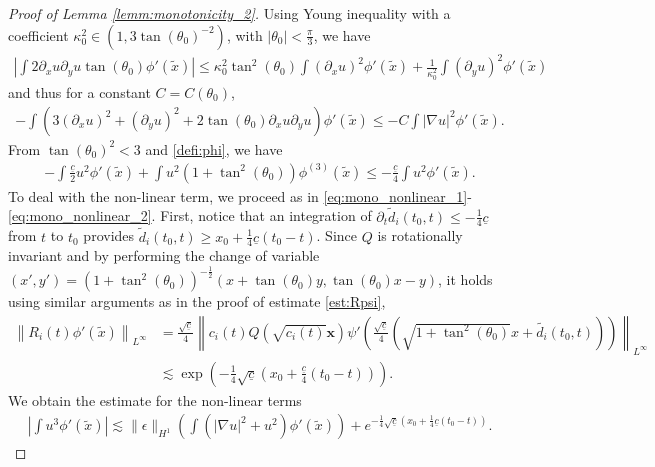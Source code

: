\documentclass[reqno,10pt]{amsart}
\numberwithin{equation}{section}
\newcommand{\bx}{\mathbf{x}}
\begin{document}
\begin{proof}[Proof of Lemma \ref{lemm:monotonicity_2}]
	Using Young inequality with a coefficient $\kappa_0^2 \in (1, 3 \tan(\theta_0)^{-2})$, with $\vert \theta_0 \vert < \frac{\pi}{3}$, we have
	\begin{align*}
		\left\vert \int 2 \partial_x u \partial_y u \tan(\theta_0) \phi'(\tilde{x}) \right\vert \leq \kappa_0^2 \tan^2(\theta_0) \int (\partial_x u)^2 \phi'(\tilde{x})  + \frac{1}{\kappa_0^2} \int (\partial_y u)^2 \phi'(\tilde{x}) 
	\end{align*}
	and thus for a constant $C= C(\theta_0)$, 
	\begin{align*}
		-\int \left( 3 (\partial_x u )^2 + (\partial_y u)^2 + 2 \tan(\theta_0) \partial_x u \partial_y u \right) \phi'(\tilde{x}) \leq - C \int \vert \nabla u \vert ^2 \phi'(\tilde{x}).
	\end{align*}
	From $\tan(\theta_0)^2 < 3$ and \eqref{defi:phi}, we have
	\begin{align*}
		-\int \frac{\underline{c}}{2} u^2 \phi'(\tilde{x}) + \int u^2 (1+\tan^2(\theta_0)) \phi^{(3)}(\tilde{x}) \leq - \frac{\underline{c}}{4} \int u^2 \phi'(\tilde{x}).
	\end{align*}
	To deal with the non-linear term, we proceed as in \eqref{eq:mono_nonlinear_1}-\eqref{eq:mono_nonlinear_2}. First, notice that an integration of $\partial_t \tilde{d}_i(t_0,t) \leq - \frac14 \underline{c}$ from $t$ to $t_0$ provides  $\tilde{d}_i(t_0,t) \geq x_0 + \frac14 \underline{c} (t_0-t)$. Since $Q$ is rotationally invariant and by performing the change of variable $(x',y')= (1+\tan^2(\theta_0))^{-\frac12} \left( x+ \tan(\theta_0)y, \tan(\theta_0)x -y \right)$, it holds using similar arguments as in the proof of estimate \eqref{est:Rpsi},
	\begin{align}
		\left\| R_i(t) \phi'(\tilde{x}) \right\|_{L^\infty} 
		& = \frac{\sqrt{\underline{c}}}{4} \left\| c_i(t) Q(\sqrt{c_i(t)}\bx) \psi' \left(\frac{\sqrt{\underline{c}}}{4} \left( \sqrt{1+\tan^2(\theta_0)} x + \tilde{d_i}(t_0,t) \right) \right) \right\|_{L^\infty} \nonumber \\
		& \lesssim \exp \left( - \frac14 \sqrt{\underline{c}} \left(x_0 + \frac{\underline{c}}{4} (t_0-t)\right) \right).\label{sol_wave_weight}
	\end{align}
 We obtain the estimate for the non-linear terms
	\begin{align}\label{eq:cubic_term_2}
		\left\vert  \int u^3 \phi'(\tilde{x}) \right\vert \lesssim \| \epsilon \|_{H^1} \left( \int \left( \vert \nabla u \vert^2 + u^2 \right) \phi'(\tilde{x}) \right) + e^{-\frac14 \sqrt{\underline{c}} \left( x_0 + \frac14 \underline{c} (t_0-t)\right)}.
	\end{align}
 

\end{proof}
\end{document}
